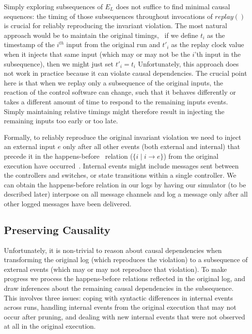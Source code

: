 Simply exploring subsequences of $E_L$ does not suffice to find
minimal causal sequences: the
timing of those subsequences throughout invocations of $replay()$ is crucial for reliably
reproducing the
invariant violation. The most natural approach would be to maintain the original
timings, \ie~if we
define $t_i$ as the timestamp of the $i^{th}$ input from the original run and $t'_i$ as the
replay clock value when it injects that same input
(which may or may not be the $i$'th input in the subsequence), then we might just set $t'_i = t_i$
Unfortunately, this approach does not work in practice because it can violate
causal dependencies. The crucial point here is that when we replay only a
subsequence of the original inputs, the reaction of the control software
can change, such that it behaves differently or takes a different amount of
time to respond to the remaining inputs events.
Simply maintaining relative timings might therefore
result in injecting the remaining inputs too early or too late.

Formally, to reliably reproduce the original invariant violation
we need to
inject an external input $e$ only after all other
events (both external and internal) that precede it in the
happens-before~\cite{Lamport:1978:TCO:359545.359563}
relation ($\{i \mid i \rightarrow e\}$) from the original execution have
occurred~\cite{tel2000introduction}. Internal events might include messages
sent between the controllers and switches, or state transitions within a single
controller. We can obtain the
happens-before relation in our logs by having our simulator
(to be described later) interpose on all message channels and
log a message only after all other logged messages have been delivered.

\subsection{Preserving Causality}

Unfortunately, it is non-trivial to reason about causal dependencies when transforming the original log
(which reproduces the violation) to a subsequence of external events
(which may or may not reproduce that violation).
To make progress we process the happens-before
relations reflected in the original log,
and draw inferences about
the remaining causal dependencies in the subsequence.
This involves three issues: coping with syntactic differences in internal
events across runs, handling internal events from the original
execution that may not occur after pruning, and dealing with new internal events that were not
observed at all in the original execution.

